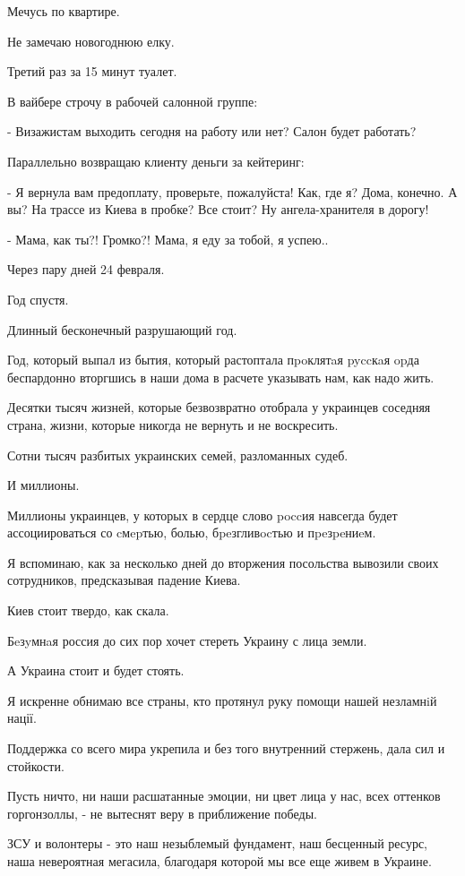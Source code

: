 Мечусь по квартире. 

Не замечаю новогоднюю елку.

Третий раз за 15 минут туалет.

В вайбере строчу в рабочей салонной группе: 

- Визажистам выходить сегодня на работу или нет? Салон будет работать?

Параллельно возвращаю клиенту деньги за кейтеринг: 

- Я вернула вам предоплату, проверьте, пожалуйста! Как, где я? Дома, конечно. А
вы? На трассе из Киева в пробке? Все стоит? Ну ангела-хранителя в дорогу!

- Мама, как ты?! Громко?! Мама, я еду за тобой, я успею.. 

Через пару дней 24 февраля.

Год спустя.

Длинный бесконечный разрушающий год. 

Год, который выпал из бытия, который растоптала пpoклятaя pyccкaя opда
беспардонно вторгшись в наши дома в расчете указывать нам, как надо жить.

Десятки тысяч жизней, которые безвозвратно отобрала у украинцев соседняя
страна, жизни, которые никогда не вернуть и не воскресить. 

Сотни тысяч разбитых украинских семей, разломанных судеб.

И миллионы. 

Миллионы украинцев, у которых в сердце слово poccия навсегда будет
ассоциироваться со cмepтью, болью, бpeзгливocтью и пpeзpeниeм.

Я вспоминаю, как за несколько дней до вторжения посольства вывозили своих
сотрудников, предсказывая падение Киева. 

Киев стоит твердо, как скала.

Бeзyмнaя россия до сих пор хочет стереть Украину с лица земли. 

А Украина стоит и будет стоять.

Я искренне обнимаю все страны, кто протянул руку помощи нашей незламнiй нації. 

Поддержка со всего мира укрепила и без того внутренний стержень, дала сил и
стойкости. 

Пусть ничто, ни наши расшатанные эмоции, ни цвет лица у нас, всех оттенков
горгонзоллы, - не вытеснят веру в приближение победы. 

ЗСУ и волонтеры - это наш незыблемый фундамент, наш бесценный ресурс, наша
невероятная мегасила, благодаря которой мы все еще живем в Украине. 

